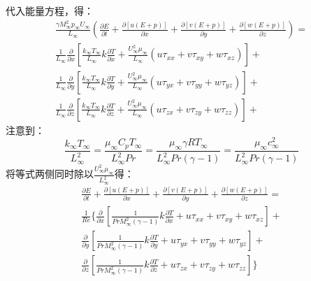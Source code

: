 \documentclass[12pt, a4paper]{article}
\begin{document}
代入能量方程，得：
    \begin{equation}
        \begin{gathered}
            \frac{\gamma M_{\infty}^{2}p_{\infty}U_{\infty}}{L_{\infty}}(\frac{\partial E}{\partial t} + \frac{\partial[u(E+p)]}{\partial x} + \frac{\partial[v(E+p)]}{\partial y} + \frac{\partial[w(E+p)]}{\partial z}) = \\
            \frac{1}{L_{\infty}}\frac{\partial}{\partial x}[\frac{k_{\infty}T_{\infty}}{L_{\infty}}k\frac{\partial T}{\partial x} + \frac{U_{\infty}^2\mu_{\infty}}{L_{\infty}}(u\tau_{xx} + v\tau_{xy} + w\tau_{xz})] + \\
            \frac{1}{L_{\infty}}\frac{\partial}{\partial y}[\frac{k_{\infty}T_{\infty}}{L_{\infty}}k\frac{\partial T}{\partial y} + \frac{U_{\infty}^2\mu_{\infty}}{L_{\infty}}(u\tau_{yx} + v\tau_{yy} + w\tau_{yz})] +\\
            \frac{1}{L_{\infty}}\frac{\partial}{\partial z}[\frac{k_{\infty}T_{\infty}}{L_{\infty}}k\frac{\partial T}{\partial z} + \frac{U_{\infty}^2\mu_{\infty}}{L_{\infty}}(u\tau_{zx} + v\tau_{zy} + w\tau_{zz})] +
        \end{gathered}
    \end{equation}
注意到：
    \begin{equation}
        \frac{k_{\infty}{T_\infty}}{L^2_{\infty}} = \frac{\mu_{\infty}C_pT_{\infty}}{L_{\infty}^2Pr} = \frac{\mu_{\infty}\gamma RT_{\infty}}{L_{\infty}^2Pr(\gamma - 1)} = \frac{\mu_{\infty}c_{\infty}^2}{L_{\infty}^2Pr(\gamma - 1)}
    \end{equation}
将等式两侧同时除以$\frac{U_{\infty}^2\mu_{\infty}}{L_{\infty}^2}$得：
    \begin{equation}
        \begin{gathered}
            \frac{\partial E}{\partial t} + \frac{\partial[u(E+p)]}{\partial x} + \frac{\partial[v(E+p)]}{\partial y} + \frac{\partial[w(E+p)]}{\partial z} = \\
            \frac{1}{Re}\{ \frac{\partial}{\partial x}[\frac{1}{PrM^2_{\infty}(\gamma-1)}k\frac{\partial T}{\partial x} + u\tau_{xx} + v\tau_{xy} + w\tau_{xz}] + \\
            \frac{\partial}{\partial y}[\frac{1}{PrM^2_{\infty}(\gamma-1)}k\frac{\partial T}{\partial y} + u\tau_{yx} + v\tau_{yy} + w\tau_{yz}] + \\
            \frac{\partial}{\partial z}[\frac{1}{PrM^2_{\infty}(\gamma-1)}k\frac{\partial T}{\partial z} + u\tau_{zx} + v\tau_{zy} + w\tau_{zz}]\} 
        \end{gathered}
    \end{equation}
\end{document}
